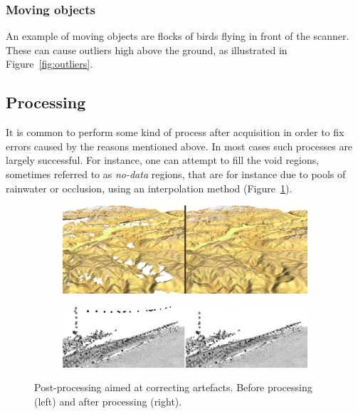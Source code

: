 \subsubsection{Moving objects}
An example of moving objects are flocks of birds flying in front of the scanner. These can cause outliers high above the ground, as illustrated in Figure~\ref{fig:outliers}.


\subsection{Processing}
It is common to perform some kind of process after acquisition in order to fix errors caused by the reasons mentioned above. 
In most cases such processes are largely successful. 
For instance, one can attempt to fill the void regions, sometimes referred to as \emph{no-data} regions, that are for instance due to pools of rainwater or occlusion, using an interpolation method (Figure~\ref{fig:voidfill}).
\begin{figure}
	\centering
	\begin{subfigure}{0.9\linewidth}
		\includegraphics[width=\textwidth]{figs/srtm_trento_voidfill.png}
		\label{fig:voidfill}
	\end{subfigure}
	\begin{subfigure}{0.9\linewidth}
		\includegraphics[width=\textwidth]{figs/ourlier-detection-wrong.png}
				\label{fig:outlier-wrong}
	\end{subfigure}
	\caption{Post-processing aimed at correcting artefacts. Before processing (left) and after processing (right).}%
	\label{fig:processing}
\end{figure}
